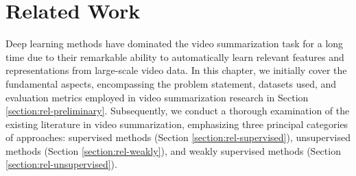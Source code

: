 \chapter{Related Work}
\label{chapter:related}

\begin{ChapAbstract}
  Deep learning methods have dominated the video summarization task for a long time due to their remarkable ability to automatically learn relevant features and representations from large-scale video data. In this chapter, we initially cover the fundamental aspects, encompassing the problem statement, datasets used, and evaluation metrics employed in video summarization research in Section \ref{section:rel-preliminary}. Subsequently, we conduct a thorough examination of the existing literature in video summarization, emphasizing three principal categories of approaches: supervised methods (Section \ref{section:rel-supervised}), unsupervised methods (Section \ref{section:rel-weakly}), and weakly supervised methods (Section \ref{section:rel-unsupervised}).
\end{ChapAbstract}








